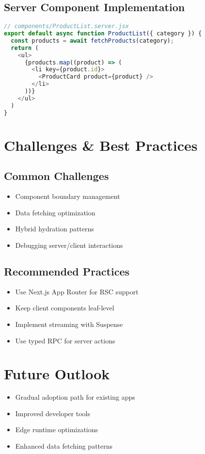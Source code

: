 \documentclass[12pt]{article}
\begin{document}
\subsection*{Server Component Implementation}
\begin{lstlisting}[language=JavaScript]
// components/ProductList.server.jsx
export default async function ProductList({ category }) {
  const products = await fetchProducts(category);
  return (
    <ul>
      {products.map((product) => (
        <li key={product.id}>
          <ProductCard product={product} />
        </li>
      ))}
    </ul>
  )
}
\end{lstlisting}

\section{Challenges \& Best Practices}
\subsection*{Common Challenges}
\begin{itemize}
    \item Component boundary management
    \item Data fetching optimization
    \item Hybrid hydration patterns
    \item Debugging server/client interactions
\end{itemize}

\subsection*{Recommended Practices}
\begin{itemize}
    \item Use Next.js App Router for RSC support
    \item Keep client components leaf-level
    \item Implement streaming with Suspense
    \item Use typed RPC for server actions
\end{itemize}

\section{Future Outlook}
\begin{itemize}
    \item Gradual adoption path for existing apps
    \item Improved developer tools
    \item Edge runtime optimizations
    \item Enhanced data fetching patterns
\end{itemize}
\end{document}
